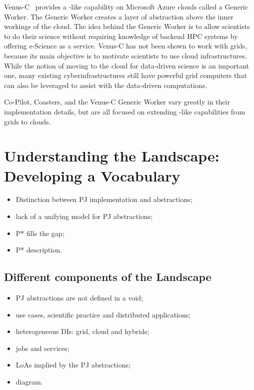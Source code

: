 \documentclass{sig-alternate}
\begin{document}
Venus-C~\cite{venusc-generic-worker} provides a \pilotjob-like
capability on Microsoft Azure clouds called a Generic Worker. The
Generic Worker creates a layer of abstraction above the inner workings
of the cloud.  The idea behind the Generic Worker is to allow
scientists to do their science without requiring knowledge of backend
HPC systems by offering e-Science as a service. Venus-C has not been
shown to work with grids, because its main objective is to motivate
scientists to use cloud infrastructures.  While the notion of moving
to the cloud for data-driven science is an important one, many
existing cyberinfrastructures still have powerful grid computers that
can also be leveraged to assist with the data-driven computations.

Co-Pilot, Coasters, and the Venus-C Generic Worker vary greatly in
their implementation details, but are all focused on extending
\pilotjob-like capabilities from grids to clouds.

\section{Understanding the Landscape: Developing a Vocabulary}


\begin{itemize}
	\item Distinction between PJ implementation and abstractions;
        \item lack of a unifying model for PJ abstractions;
        \item P* fills the gap;
        \item P* description.
\end{itemize}

\subsection{Different components of the Landscape}


\begin{itemize}
        \item PJ abstractions are not defined in a void;
	\item use cases, scientific practice and distributed applications;
        \item heterogeneous DIs: grid, cloud and hybrids;
	\item jobs and services;
        \item LoAs implied by the PJ abstractions;
	\item diagram.
\end{itemize}
\end{document}
